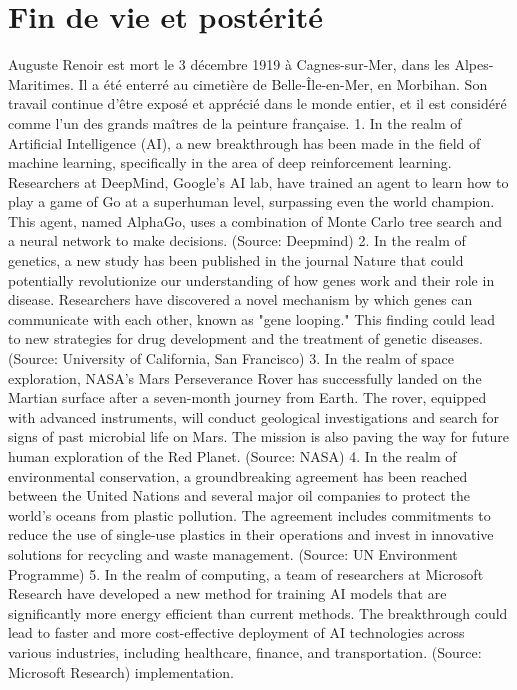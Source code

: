 \documentclass[12pt, a4paper]{article}
\begin{document}
   \section*{Fin de vie et postérité}
   \noindent
   Auguste Renoir est mort le 3 décembre 1919 à Cagnes-sur-Mer, dans les Alpes-Maritimes. Il a été enterré au cimetière de Belle-Île-en-Mer, en Morbihan. Son travail continue d'être exposé et apprécié dans le monde entier, et il est considéré comme l'un des grands maîtres de la peinture française. 1. In the realm of Artificial Intelligence (AI), a new breakthrough has been made in the field of machine learning, specifically in the area of deep reinforcement learning. Researchers at DeepMind, Google's AI lab, have trained an agent to learn how to play a game of Go at a superhuman level, surpassing even the world champion. This agent, named AlphaGo, uses a combination of Monte Carlo tree search and a neural network to make decisions. (Source: Deepmind) 2. In the realm of genetics, a new study has been published in the journal Nature that could potentially revolutionize our understanding of how genes work and their role in disease. Researchers have discovered a novel mechanism by which genes can communicate with each other, known as "gene looping." This finding could lead to new strategies for drug development and the treatment of genetic diseases. (Source: University of California, San Francisco) 3. In the realm of space exploration, NASA's Mars Perseverance Rover has successfully landed on the Martian surface after a seven-month journey from Earth. The rover, equipped with advanced instruments, will conduct geological investigations and search for signs of past microbial life on Mars. The mission is also paving the way for future human exploration of the Red Planet. (Source: NASA) 4. In the realm of environmental conservation, a groundbreaking agreement has been reached between the United Nations and several major oil companies to protect the world's oceans from plastic pollution. The agreement includes commitments to reduce the use of single-use plastics in their operations and invest in innovative solutions for recycling and waste management. (Source: UN Environment Programme) 5. In the realm of computing, a team of researchers at Microsoft Research have developed a new method for training AI models that are significantly more energy efficient than current methods. The breakthrough could lead to faster and more cost-effective deployment of AI technologies across various industries, including healthcare, finance, and transportation. (Source: Microsoft Research) implementation.

   
\end{document}
